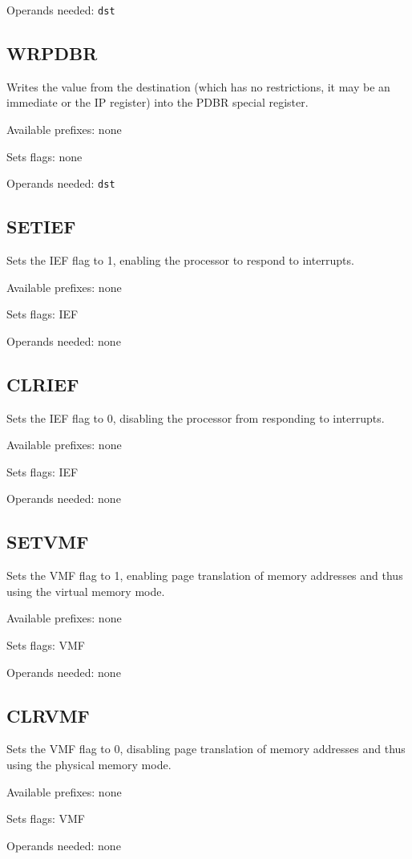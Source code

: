 \documentclass[12pt,a4paper]{report}
\begin{document}
Operands needed: \texttt{dst}

\subsection*{WRPDBR}
Writes the value from the destination (which has no restrictions, it may be an immediate or the IP register) into the PDBR special register.

Available prefixes: none

Sets flags: none

Operands needed: \texttt{dst}

\subsection*{SETIEF}
Sets the IEF flag to 1, enabling the processor to respond to interrupts.

Available prefixes: none

Sets flags: IEF

Operands needed: none

\subsection*{CLRIEF}
Sets the IEF flag to 0, disabling the processor from responding to interrupts.

Available prefixes: none

Sets flags: IEF

Operands needed: none

\subsection*{SETVMF}
Sets the VMF flag to 1, enabling page translation of memory addresses and thus using the virtual memory mode.

Available prefixes: none

Sets flags: VMF

Operands needed: none

\subsection*{CLRVMF}
Sets the VMF flag to 0, disabling page translation of memory addresses and thus using the physical memory mode.

Available prefixes: none

Sets flags: VMF

Operands needed: none
\end{document}
